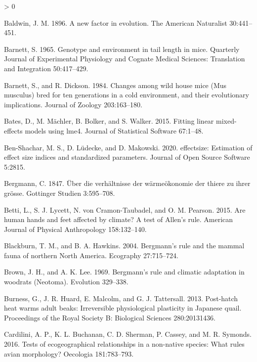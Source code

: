 \documentclass[
]{article}
\newlength{\cslhangindent}
\newenvironment{CSLReferences}[2] %
 {%
  \setlength{\parindent}{0pt}
  \ifodd #1 \everypar{\setlength{\hangindent}{\cslhangindent}}\ignorespaces\fi
  \ifnum #2 > 0
  \setlength{\parskip}{#2\baselineskip}
  \fi
 }%
 {}
\begin{document}
\begin{CSLReferences}{0}{0}
\leavevmode\hypertarget{ref-Baldwin1896}{}%
Baldwin, J. M. 1896. A new factor in evolution. The American Naturalist
30:441--451.

\leavevmode\hypertarget{ref-Barnett1965}{}%
Barnett, S. 1965. Genotype and environment in tail length in mice.
Quarterly Journal of Experimental Physiology and Cognate Medical
Sciences: Translation and Integration 50:417--429.

\leavevmode\hypertarget{ref-Barnett1984}{}%
Barnett, S., and R. Dickson. 1984. Changes among wild house mice ({Mus}
musculus) bred for ten generations in a cold environment, and their
evolutionary implications. Journal of Zoology 203:163--180.

\leavevmode\hypertarget{ref-Bates2015}{}%
Bates, D., M. Mächler, B. Bolker, and S. Walker. 2015. Fitting linear
mixed-effects models using {lme4}. Journal of Statistical Software
67:1--48.

\leavevmode\hypertarget{ref-Ben-Shachar2020}{}%
Ben-Shachar, M. S., D. Lüdecke, and D. Makowski. 2020. {e}ffectsize:
Estimation of effect size indices and standardized parameters. Journal
of Open Source Software 5:2815.

\leavevmode\hypertarget{ref-Bergmann1847}{}%
Bergmann, C. 1847. {Ü}ber die verh{ä}ltnisse der w{ä}rme{ö}konomie der
thiere zu ihrer gr{ö}sse. Gottinger Studien 3:595--708.

\leavevmode\hypertarget{ref-Betti2015}{}%
Betti, L., S. J. Lycett, N. von Cramon-Taubadel, and O. M. Pearson.
2015. Are human hands and feet affected by climate? A test of {Allen's}
rule. American Journal of Physical Anthropology 158:132--140.

\leavevmode\hypertarget{ref-Blackburn2004}{}%
Blackburn, T. M., and B. A. Hawkins. 2004. Bergmann's rule and the
mammal fauna of northern {North} {America}. Ecography 27:715--724.

\leavevmode\hypertarget{ref-Brown1969}{}%
Brown, J. H., and A. K. Lee. 1969. Bergmann's rule and climatic
adaptation in woodrats ({Neotoma}). Evolution 329--338.

\leavevmode\hypertarget{ref-Burness2013}{}%
Burness, G., J. R. Huard, E. Malcolm, and G. J. Tattersall. 2013.
Post-hatch heat warms adult beaks: Irreversible physiological plasticity
in {Japanese} quail. Proceedings of the Royal Society B: Biological
Sciences 280:20131436.

\leavevmode\hypertarget{ref-Cardilini2016}{}%
Cardilini, A. P., K. L. Buchanan, C. D. Sherman, P. Cassey, and M. R.
Symonds. 2016. Tests of ecogeographical relationships in a non-native
species: What rules avian morphology? Oecologia 181:783--793.


\end{CSLReferences}
\end{document}
